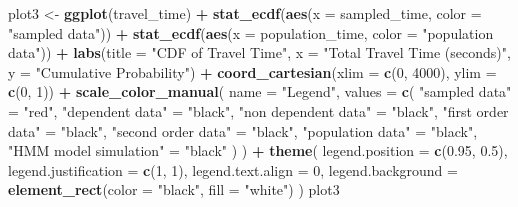 \documentclass[
]{article}
\newenvironment{Shaded}{\begin{snugshade}}{\end{snugshade}}
\newcommand{\AttributeTok}[1]{\textcolor[rgb]{0.13,0.29,0.53}{#1}}
\newcommand{\DecValTok}[1]{\textcolor[rgb]{0.00,0.00,0.81}{#1}}
\newcommand{\FloatTok}[1]{\textcolor[rgb]{0.00,0.00,0.81}{#1}}
\newcommand{\FunctionTok}[1]{\textcolor[rgb]{0.13,0.29,0.53}{\textbf{#1}}}
\newcommand{\NormalTok}[1]{#1}
\newcommand{\OtherTok}[1]{\textcolor[rgb]{0.56,0.35,0.01}{#1}}
\newcommand{\SpecialCharTok}[1]{\textcolor[rgb]{0.81,0.36,0.00}{\textbf{#1}}}
\newcommand{\StringTok}[1]{\textcolor[rgb]{0.31,0.60,0.02}{#1}}
\begin{document}
\begin{Shaded}
\begin{Highlighting}[]
\NormalTok{plot3 }\OtherTok{\textless{}{-}} \FunctionTok{ggplot}\NormalTok{(travel\_time) }\SpecialCharTok{+}
  \FunctionTok{stat\_ecdf}\NormalTok{(}\FunctionTok{aes}\NormalTok{(}\AttributeTok{x =}\NormalTok{ sampled\_time, }\AttributeTok{color =} \StringTok{"sampled data"}\NormalTok{)) }\SpecialCharTok{+}
  \FunctionTok{stat\_ecdf}\NormalTok{(}\FunctionTok{aes}\NormalTok{(}\AttributeTok{x =}\NormalTok{ population\_time, }\AttributeTok{color =} \StringTok{"population data"}\NormalTok{)) }\SpecialCharTok{+}
  \FunctionTok{labs}\NormalTok{(}\AttributeTok{title =} \StringTok{"CDF of Travel Time"}\NormalTok{, }\AttributeTok{x =} \StringTok{"Total Travel Time (seconds)"}\NormalTok{, }\AttributeTok{y =} \StringTok{"Cumulative Probability"}\NormalTok{) }\SpecialCharTok{+}
  \FunctionTok{coord\_cartesian}\NormalTok{(}\AttributeTok{xlim =} \FunctionTok{c}\NormalTok{(}\DecValTok{0}\NormalTok{, }\DecValTok{4000}\NormalTok{), }\AttributeTok{ylim =} \FunctionTok{c}\NormalTok{(}\DecValTok{0}\NormalTok{, }\DecValTok{1}\NormalTok{)) }\SpecialCharTok{+}
  \FunctionTok{scale\_color\_manual}\NormalTok{(}
    \AttributeTok{name =} \StringTok{"Legend"}\NormalTok{,}
    \AttributeTok{values =} \FunctionTok{c}\NormalTok{(}
      \StringTok{"sampled data"} \OtherTok{=} \StringTok{"red"}\NormalTok{,}
      \StringTok{"dependent data"} \OtherTok{=} \StringTok{"black"}\NormalTok{,}
      \StringTok{"non dependent data"} \OtherTok{=} \StringTok{"black"}\NormalTok{,}
      \StringTok{"first order data"} \OtherTok{=} \StringTok{"black"}\NormalTok{,}
      \StringTok{"second order data"} \OtherTok{=} \StringTok{"black"}\NormalTok{,}
      \StringTok{"population data"} \OtherTok{=} \StringTok{"black"}\NormalTok{,}
      \StringTok{"HMM model simulation"} \OtherTok{=} \StringTok{"black"}
\NormalTok{    )}
\NormalTok{  ) }\SpecialCharTok{+}
  \FunctionTok{theme}\NormalTok{(}
    \AttributeTok{legend.position =} \FunctionTok{c}\NormalTok{(}\FloatTok{0.95}\NormalTok{, }\FloatTok{0.5}\NormalTok{),}
    \AttributeTok{legend.justification =} \FunctionTok{c}\NormalTok{(}\DecValTok{1}\NormalTok{, }\DecValTok{1}\NormalTok{),}
    \AttributeTok{legend.text.align =} \DecValTok{0}\NormalTok{,}
    \AttributeTok{legend.background =} \FunctionTok{element\_rect}\NormalTok{(}\AttributeTok{color =} \StringTok{"black"}\NormalTok{, }\AttributeTok{fill =} \StringTok{"white"}\NormalTok{)}
\NormalTok{  )}
\NormalTok{plot3}
\end{Highlighting}
\end{Shaded}
\end{document}
